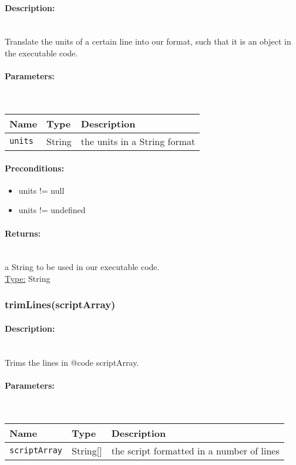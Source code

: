 \paragraph{Description:} \hfill \\ 
Translate the units of a certain line into our format, such
that it is an object in the executable code.
\paragraph{Parameters:} \hfill \\ 
\begin{tabular}{|l|l|l|}
\hline
\textbf{Name} & \textbf{Type} & \textbf{Description} \\ 
\hline
\texttt{units} & String & the units in a String format\\ 
\hline
\end{tabular}
\paragraph{Preconditions:} 
\begin{itemize}  
\item  units != null
\item  units != undefined
\end{itemize}  
\paragraph{Returns:} \hfill \\ 
a String to be used in our executable code.\\ 
\underline{Type:} String
\subsubsection{trimLines(scriptArray)} 
\paragraph{Description:} \hfill \\ 
Trims the lines in {@code scriptArray}.
\paragraph{Parameters:} \hfill \\ 
\begin{tabular}{|l|l|l|}
\hline
\textbf{Name} & \textbf{Type} & \textbf{Description} \\ 
\hline
\texttt{scriptArray} & String[] & the script formatted in a number of lines\\ 
\hline
\end{tabular}
